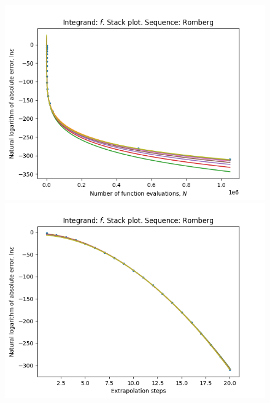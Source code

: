 \begin{figure}[H]
\centering
\begin{minipage}{0.45\textwidth}
\centering
\includegraphics[scale=0.45]{../results/romberg_plots/cos_squared_hp_romberg_stack.png}
\end{minipage}
\begin{minipage}{0.45\textwidth}
\centering
\includegraphics[scale=0.45]{../results/romberg_plots/cos_squared_hp_romberg_steps_stack.png}
\end{minipage}
\end{figure}

